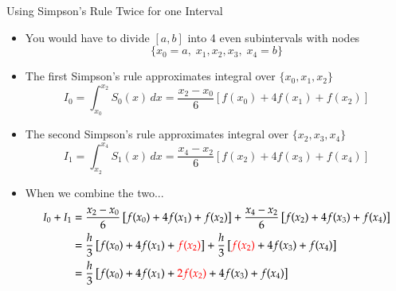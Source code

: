 \documentclass[10pt]{beamer}
\begin{document}
\begin{frame}[shrink]{Using Simpson's Rule Twice for one Interval}



\begin{itemize}
    \item You would have to divide $[a,b]$ into 4 even subintervals with nodes 
        $$ \{  x_0 = a,\; x_1, x_2, x_3,\; x_4=b\}$$
    \item The first Simpson's rule approximates integral over $\{x_0, x_1, x_2\}$ 
         $$I_0 = \int_{x_0}^{x_2} S_0(x) \,dx = \frac{x_2-x_0}{6} \left[f(x_0) + 4f(x_1) + f(x_2) \right] $$
    \item The second Simpson's rule approximates integral over $\{x_2, x_3, x_4\}$ 
         $$I_1 = \int_{x_2}^{x_4} S_1(x) \,dx = \frac{x_4-x_2}{6} \left[f(x_2) + 4f(x_3) + f(x_4) \right] $$
    \item When we combine the two...
        \begin{align*}
        I_0 + I_1 &=\frac{x_2-x_0}{6} \left[f(x_0) + 4f(x_1) + f(x_2) \right] + \frac{x_4-x_2}{6} \left[f(x_2) + 4f(x_3) + f(x_4) \right]\\
                  &=\frac{h}{3} \left[f(x_0) + 4f(x_1) + \textcolor{red}{{f(x_2)}} \right] + \frac{h}{3} \left[\textcolor{red}{f(x_2)} + 4f(x_3) + f(x_4) \right]\\
                  &=\frac{h}{3} \left[f(x_0) + 4f(x_1) + \textcolor{red}{2f(x_2)} + 4f(x_3) + f(x_4) \right]\\
        \end{align*}

\end{itemize}



\end{frame}
\end{document}
